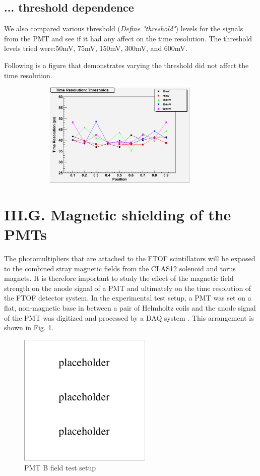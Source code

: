 \documentclass[12pt]{article}
\begin{document}
\subsection{... threshold dependence}
We also compared various threshold (\textit{Define "threshold"}) levels for the signals from the PMT and see if it had any affect on the time resolution. The threshold levels tried were:50mV, 75mV, 150mV, 300mV, and 600mV.

Following is a figure that demonstrates varying the threshold did not affect the time resolution.
\begin{figure}[th]
	\includegraphics[width=10cm, height=5cm]{ThresholdsTimeRes.pdf}
\end{figure}

\section{III.G. Magnetic shielding of the PMTs}
The photomultipliers that are attached to the FTOF scintillators will be exposed to the combined stray magnetic fields from the CLAS12 solenoid and torus magnets. It is therefore important to study the effect of the magnetic field strength on the anode signal of a PMT and ultimately on the time resolution of the FTOF detector system. In the experimental test setup, a PMT was set on a flat, non-magnetic base in between a pair of Helmholtz coils and the anode signal of the PMT was digitized and processed by a DAQ system . This arrangement is shown in Fig. 1.

\begin{figure}[ht]
  \includegraphics[width=2.5in]{placeholder.pdf} 
  \caption{PMT B field test setup}
  \label{fig1}
\end{figure}
\end{document}
